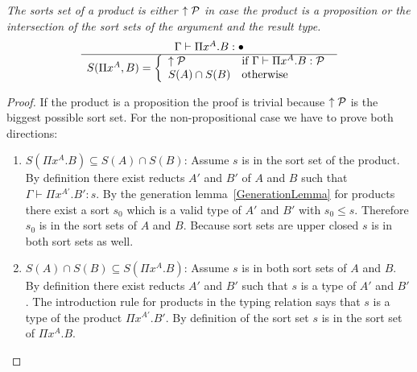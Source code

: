 \begin{theorem}
    \label{thm:SortSetProduct}
    \emph{The sorts set of a product is either ${\uparrow {\cal P}}$ in case the product
    is a proposition or the intersection of the sort sets of the argument and
    the result type.}
    $$
    \ruleh{
        \Gamma \vdash \Pi x^A. B : \dontcare
    }
    {
        S(\Pi x^A, B) =
        \dcases{
            \upper\Prop & \text{if }\Gamma \vdash \Pi x^A . B : \Prop
            \\
            S(A) \cap S(B) & \text{otherwise}
        }
    }
    $$
    \begin{proof}
        If the product is a proposition the proof is trivial because
        ${\uparrow {\cal P}}$ is the biggest possible sort set. For the
        non-propositional case we have to prove both directions:
        \begin{enumerate}
            \item $S(\Pi x^A. B) \subseteq S(A) \cap S(B)$:
                Assume $s$ is in the sort set of the product. By definition
                there exist reducts $A'$ and $B'$ of $A$ and $B$ such that
                $\Gamma \vdash \Pi x^{A'}. B' : s$. By the generation
                lemma~\ref{GenerationLemma} for products there exist a sort
                $s_0$ which is a valid type of $A'$ and $B'$ with $s_0 \le s$.
                Therefore $s_0$ is in the sort sets of $A$ and $B$. Because sort
                sets are upper closed $s$ is in both sort sets as well.

            \item $S(A) \cap S(B) \subseteq S(\Pi x^A. B)$:
                Assume $s$ is in both sort sets of $A$ and $B$. By definition
                there exist reducts $A'$ and $B'$ such that $s$ is a type of
                $A'$ and $B'$. The introduction rule for products in the typing
                relation says that $s$ is a type of the product $\Pi x^{A'}.
                B'$. By definition of the sort set $s$ is in the sort set of
                $\Pi x^A. B$.
        \end{enumerate}
    \end{proof}
\end{theorem}






